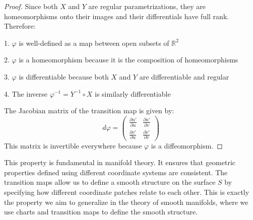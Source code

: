 \documentclass{article}
\begin{document}
\begin{proof}
Since both $X$ and $Y$ are regular parametrizations, they are homeomorphisms onto their images and their differentials have full rank. Therefore:

1. $\varphi$ is well-defined as a map between open subsets of $\mathbb{R}^2$

2. $\varphi$ is a homeomorphism because it is the composition of homeomorphisms

3. $\varphi$ is differentiable because both $X$ and $Y$ are differentiable and regular

4. The inverse $\varphi^{-1} = Y^{-1} \circ X$ is similarly differentiable

The Jacobian matrix of the transition map is given by:
\[
d\varphi = \begin{pmatrix}
\frac{\partial u'}{\partial u} & \frac{\partial u'}{\partial v} \\
\frac{\partial v'}{\partial u} & \frac{\partial v'}{\partial v}
\end{pmatrix}
\]
This matrix is invertible everywhere because $\varphi$ is a diffeomorphism.
\end{proof}
\begin{remark}
This property is fundamental in manifold theory. It ensures that geometric properties defined using different coordinate systems are consistent. The transition maps allow us to define a smooth structure on the surface $S$ by specifying how different coordinate patches relate to each other.
This is exactly the property we aim to generalize in the theory of smooth manifolds, where we use charts and transition maps to define the smooth structure.
\end{remark}
\end{document}
